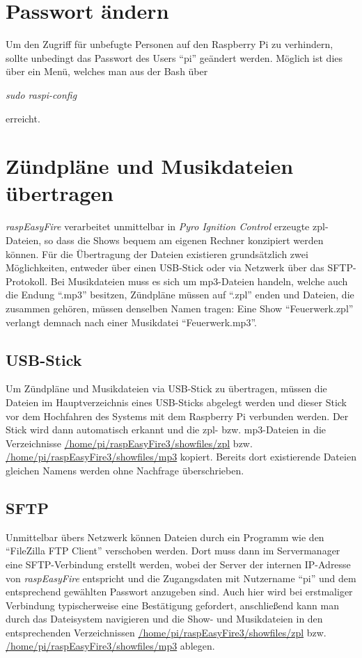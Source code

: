 \documentclass[paper=a4, parskip, numbers=noenddot, toc=listof, headsepline]{scrbook}
\newcommand{\pic}{\emph{Pyro Ignition Control}}
\newcommand{\REF}{\emph{raspEasyFire}}
\begin{document}
		\section{Passwort ändern}
			Um den Zugriff für unbefugte Personen auf den Raspberry Pi zu verhindern, sollte unbedingt das Passwort des Users \enquote{pi} geändert werden. Möglich ist dies über ein Menü, welches man aus der Bash über
			\begin{center}
				\emph{sudo raspi-config}
			\end{center}
			erreicht.

		\section{Zündpläne und Musikdateien übertragen}
				{\REF} verarbeitet unmittelbar in {\pic} erzeugte zpl-Dateien, so dass die Shows bequem am eigenen Rechner konzipiert werden können. Für die Übertragung der Dateien existieren grundsätzlich zwei Möglichkeiten, entweder über einen USB-Stick oder via Netzwerk über das SFTP-Protokoll. Bei Musikdateien muss es sich um mp3-Dateien handeln, welche auch die Endung \enquote{.mp3} besitzen, Zündpläne müssen auf \enquote{.zpl} enden und Dateien, die zusammen gehören, müssen denselben Namen tragen: Eine Show \enquote{Feuerwerk.zpl} verlangt demnach nach einer Musikdatei \enquote{Feuerwerk.mp3}.

			\subsection{USB-Stick}

				Um Zündpläne und Musikdateien via USB-Stick zu übertragen, müssen die Dateien im Hauptverzeichnis eines USB-Sticks abgelegt werden und dieser Stick vor dem Hochfahren des Systems mit dem Raspberry Pi verbunden werden. Der Stick wird dann automatisch erkannt und die zpl- bzw. mp3-Dateien in die Verzeichnisse \url{/home/pi/raspEasyFire3/showfiles/zpl} bzw. \url{/home/pi/raspEasyFire3/showfiles/mp3} kopiert. Bereits dort existierende Dateien gleichen Namens werden ohne Nachfrage überschrieben.

			\subsection{SFTP}

				Unmittelbar übers Netzwerk können Dateien durch ein Programm wie den \enquote{FileZilla FTP Client} verschoben werden. Dort muss dann im Servermanager eine SFTP-Verbindung erstellt werden, wobei der Server der internen IP-Adresse von {\REF} entspricht und die Zugangsdaten mit Nutzername \enquote{pi} und dem entsprechend gewählten Passwort anzugeben sind. Auch hier wird bei erstmaliger Verbindung typischerweise eine Bestätigung gefordert, anschließend kann man durch das Dateisystem navigieren und die Show- und Musikdateien in den entsprechenden Verzeichnissen \url{/home/pi/raspEasyFire3/showfiles/zpl} bzw. \url{/home/pi/raspEasyFire3/showfiles/mp3} ablegen.
\end{document}
